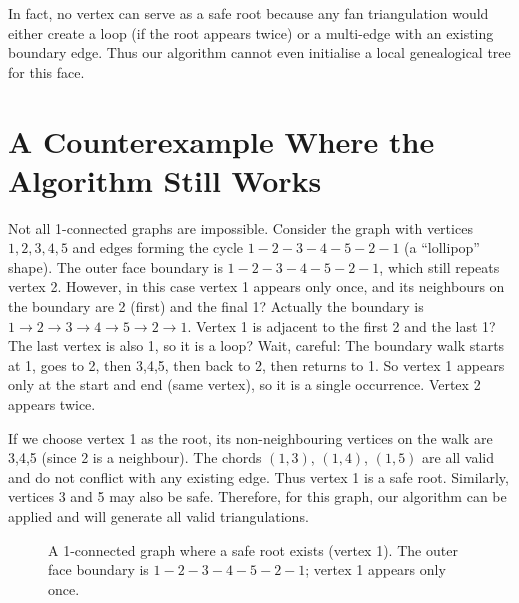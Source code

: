 In fact, no vertex can serve as a safe root because any fan triangulation would either create a loop (if the root appears twice) or a multi-edge with an existing boundary edge. 
Thus our algorithm cannot even initialise a local genealogical tree for this face.

\section{A Counterexample Where the Algorithm Still Works}
\label{sec:counterexample_works}

Not all 1-connected graphs are impossible. 
Consider the graph with vertices \(1,2,3,4,5\) and edges forming the cycle \(1-2-3-4-5-2-1\) (a “lollipop” shape). 
The outer face boundary is \(1-2-3-4-5-2-1\), which still repeats vertex 2. 
However, in this case vertex 1 appears only once, and its neighbours on the boundary are 2 (first) and the final 1? Actually the boundary is \(1 \to 2 \to 3 \to 4 \to 5 \to 2 \to 1\). 
Vertex 1 is adjacent to the first 2 and the last 1? The last vertex is also 1, so it is a loop? Wait, careful: The boundary walk starts at 1, goes to 2, then 3,4,5, then back to 2, then returns to 1. 
So vertex 1 appears only at the start and end (same vertex), so it is a single occurrence. 
Vertex 2 appears twice.

If we choose vertex 1 as the root, its non-neighbouring vertices on the walk are 3,4,5 (since 2 is a neighbour). 
The chords \((1,3)\), \((1,4)\), \((1,5)\) are all valid and do not conflict with any existing edge. 
Thus vertex 1 is a safe root. 
Similarly, vertices 3 and 5 may also be safe. 
Therefore, for this graph, our algorithm can be applied and will generate all valid triangulations.

\begin{figure}[htbp]
    \centering
    \caption{A 1-connected graph where a safe root exists (vertex 1). 
    The outer face boundary is \(1-2-3-4-5-2-1\); vertex 1 appears only once.}
    \label{fig:lollipop}
\end{figure}

